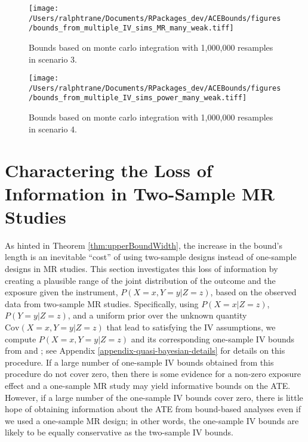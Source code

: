 \documentclass[AMA,STIX1COL,]{WileyNJD-v2}
\begin{document}
\clearpage

\begin{sidewaysfigure}
  \centering
  \texttt{[image: /Users/ralphtrane/Documents/RPackages\_dev/ACEBounds/figures/bounds\_from\_multiple\_IV\_sims\_MR\_many\_weak.tiff]}
  \caption{Bounds based on monte carlo integration with 1,000,000 resamples in scenario 3.}
  \label{fig:bounds_from_multiple_IV_sims_MR_many_weak}
\end{sidewaysfigure}

\clearpage

\begin{sidewaysfigure}
  \centering
  \texttt{[image: /Users/ralphtrane/Documents/RPackages\_dev/ACEBounds/figures/bounds\_from\_multiple\_IV\_sims\_power\_many\_weak.tiff]}
  \caption{Bounds based on monte carlo integration with 1,000,000 resamples in scenario 4.}
  \label{fig:bounds_from_multiple_IV_sims_power_many_weak}
\end{sidewaysfigure}

\clearpage

\hypertarget{charactering-the-loss-of-information-in-two-sample-mr-studies}{%
\section{Charactering the Loss of Information in Two-Sample MR
Studies}\label{charactering-the-loss-of-information-in-two-sample-mr-studies}}

\label{quasi-bayesian}

As hinted in Theorem \ref{thm:upperBoundWidth}, the increase in the
bound's length is an inevitable ``cost'' of using two-sample designs
instead of one-sample designs in MR studies. This section investigates
this loss of information by creating a plausible range of the joint
distribution of the outcome and the exposure given the instrument,
\(P(X = x, Y = y | Z = z)\), based on the observed data from two-sample
MR studies. Specifically, using \(P(X = x | Z = z)\),
\(P(Y = y | Z = z)\), and a uniform prior over the unknown quantity
\(\text{Cov}(X = x, Y = y | Z = z)\) that lead to satisfying the IV
assumptions, we compute \(P(X = x, Y = y | Z = z)\) and its
corresponding one-sample IV bounds from \citep{balke_bounds_1997} and
\citep{richardson_ace_2014}; see Appendix
\ref{appendix-quasi-bayesian-details} for details on this procedure. If
a large number of one-sample IV bounds obtained from this procedure do
not cover zero, then there is some evidence for a non-zero exposure
effect and a one-sample MR study may yield informative bounds on the
ATE. However, if a large number of the one-sample IV bounds cover zero,
there is little hope of obtaining information about the ATE from
bound-based analyses even if we used a one-sample MR design; in other
words, the one-sample IV bounds are likely to be equally conservative as
the two-sample IV bounds.
\end{document}
